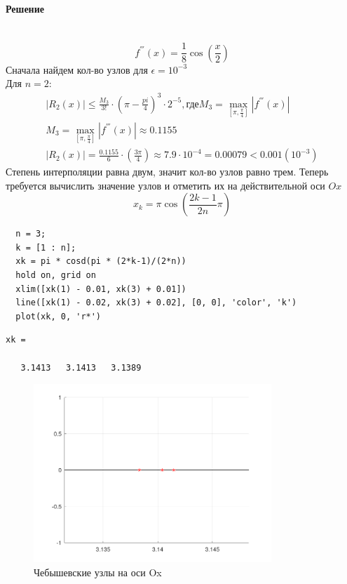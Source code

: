 \paragraph{Решение} ~\\
\[
  f^{'''}(x) = \frac{1}{8}\cos(\frac{x}{2})
\]
Сначала найдем кол-во узлов для $\epsilon = 10^{-3}$\\[2mm]
Для $n = 2$:
\begin{gather*}
  |R_{2}(x)| \leq \frac{M_{3}}{3!}\cdot\left(\pi - \frac{pi}{4}\right)^{3}\cdot2^{-5}, \text{где} M_{3} = \max_{\left[\pi, \frac{\pi}{4}\right]}|f^{'''}(x)|\\
  M_{3} = \max_{\left[\pi, \frac{\pi}{4}\right]}|f^{'''}(x)| \approx 0.1155 \\
  |R_{2}(x)| = \frac{0.1155}{6} \cdot \left(\frac{3\pi}{4} \right) \approx 7.9 \cdot 10^{-4} = 0.00079 < 0.001 (10^{-3})
\end{gather*}
Степень интерполяции равна двум, значит кол-во узлов равно трем. Теперь требуется вычислить значение узлов и отметить их на действительной оси $Ox$
\[
  x_{k} = \pi \cos\left(\frac{2k-1}{2n}\pi\right)
\]
\begin{lstlisting}
  n = 3;
  k = [1 : n];
  xk = pi * cosd(pi * (2*k-1)/(2*n))
  hold on, grid on
  xlim([xk(1) - 0.01, xk(3) + 0.01])
  line([xk(1) - 0.02, xk(3) + 0.02], [0, 0], 'color', 'k')
  plot(xk, 0, 'r*')
\end{lstlisting}
\begin{lstlisting}[backgroundcolor=\color{cyan}]
  xk =

   3.1413   3.1413   3.1389
\end{lstlisting}
\begin{figure}[h]
  \caption{Чебышевские узлы на оси Ox}
  \label{fig:plot_6}
  \centering
  \includegraphics[width=0.8\textwidth]{images/task_6_1.png}
\end{figure}

